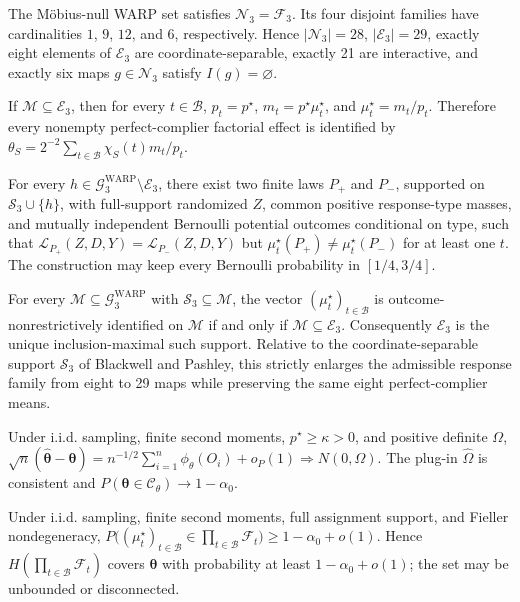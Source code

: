 The Möbius-null WARP set satisfies \(\mathcal N_3=\mathcal F_3\). Its four disjoint families have cardinalities \(1\), \(9\), \(12\), and \(6\), respectively. Hence \(|\mathcal N_3|=28\), \(|\mathcal E_3|=29\), exactly eight elements of \(\mathcal E_3\) are coordinate-separable, exactly 21 are interactive, and exactly six maps \(g\in\mathcal N_3\) satisfy \(I(g)=\varnothing\).

If \(\mathcal M\subseteq\mathcal E_3\), then for every \(t\in\mathcal B\), \(p_t=p^\star\), \(m_t=p^\star\mu_t^\star\), and \(\mu_t^\star=m_t/p_t\). Therefore every nonempty perfect-complier factorial effect is identified by \(\theta_S=2^{-2}\sum_{t\in\mathcal B}\chi_S(t)m_t/p_t\).

For every \(h\in\mathcal G^{\mathrm{WARP}}_3\setminus\mathcal E_3\), there exist two finite laws \(P_+\) and \(P_-\), supported on \(\mathcal S_3\cup\{h\}\), with full-support randomized \(Z\), common positive response-type masses, and mutually independent Bernoulli potential outcomes conditional on type, such that \(\mathcal L_{P_+}(Z,D,Y)=\mathcal L_{P_-}(Z,D,Y)\) but \(\mu_t^\star(P_+)\ne\mu_t^\star(P_-)\) for at least one \(t\). The construction may keep every Bernoulli probability in \([1/4,3/4]\).

For every \(\mathcal M\subseteq\mathcal G^{\mathrm{WARP}}_3\) with \(\mathcal S_3\subseteq\mathcal M\), the vector \((\mu_t^\star)_{t\in\mathcal B}\) is outcome-nonrestrictively identified on \(\mathcal M\) if and only if \(\mathcal M\subseteq\mathcal E_3\). Consequently \(\mathcal E_3\) is the unique inclusion-maximal such support. Relative to the coordinate-separable support \(\mathcal S_3\) of Blackwell and Pashley, this strictly enlarges the admissible response family from eight to 29 maps while preserving the same eight perfect-complier means.

Under i.i.d. sampling, finite second moments, \(p^\star\ge\kappa>0\), and positive definite \(\Omega\), \(\sqrt n(\widehat{\boldsymbol\theta}-\boldsymbol\theta)=n^{-1/2}\sum_{i=1}^n\phi_{\theta}(O_i)+o_P(1)\Rightarrow N(0,\Omega)\). The plug-in \(\widehat\Omega\) is consistent and \(P(\boldsymbol\theta\in\mathcal C_{\theta})\to1-\alpha_0\).

Under i.i.d. sampling, finite second moments, full assignment support, and Fieller nondegeneracy, \(P\bigl((\mu_t^\star)_{t\in\mathcal B}\in\prod_{t\in\mathcal B}\mathcal F_t\bigr)\ge1-\alpha_0+o(1)\). Hence \(H(\prod_{t\in\mathcal B}\mathcal F_t)\) covers \(\boldsymbol\theta\) with probability at least \(1-\alpha_0+o(1)\); the set may be unbounded or disconnected.
